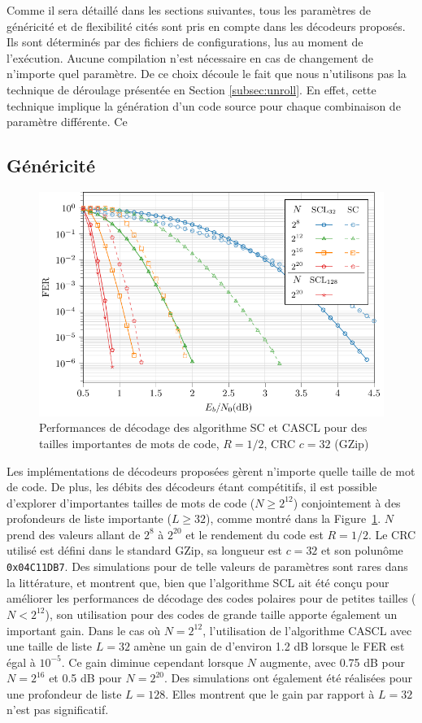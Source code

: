 Comme il sera détaillé dans les sections suivantes, tous les paramètres de généricité et de flexibilité cités sont pris en compte dans les décodeurs proposés. Ils sont déterminés par des fichiers de configurations, lus au moment de l'exécution. Aucune compilation n'est nécessaire en cas de changement de n'importe quel paramètre. De ce choix découle le fait que nous n'utilisons pas la technique de déroulage présentée en Section \ref{subsec:unroll}. En effet, cette technique implique la génération d'un code source pour chaque combinaison de paramètre différente. Ce

\subsection{Généricité}

\begin{figure}[t]
\includegraphics[width=\textwidth]{main/ch2_fig/curves/code/tikz/code}
\caption{Performances de décodage des algorithme SC et CASCL pour des tailles importantes de mots de code, $R=1/2$, CRC $c=32$ (GZip)}
\label{fig:large_scl}
\end{figure}

Les implémentations de décodeurs proposées gèrent n'importe quelle taille de mot de code. De plus, les débits des décodeurs étant compétitifs, il est possible d'explorer d'importantes tailles de mots de code ($N\geq2^{12}$) conjointement à des profondeurs de liste importante ($L \geq 32$), comme montré dans la Figure~\ref{fig:large_scl}. $N$ prend des valeurs allant de $2^8$ à $2^{20}$ et le rendement du code est $R=1/2$. Le CRC utilisé est défini dans le standard GZip, sa longueur est $c=32$ et son polunôme \texttt{0x04C11DB7}. Des simulations pour de telle valeurs de paramètres sont rares dans la littérature, et montrent que, bien que l'algorithme SCL ait été conçu pour améliorer les performances de décodage des codes polaires pour de petites tailles ($N<2^{12}$), son utilisation pour des codes de grande taille apporte également un important gain. Dans le cas où $N=2^{12}$, l'utilisation de l'algorithme CASCL avec une taille de liste $L=32$ amène un gain de d'environ 1.2 dB lorsque le FER est égal à $10^{-5}$. Ce gain diminue cependant lorsque $N$ augmente, avec 0.75 dB pour $N=2^{16}$ et 0.5 dB pour $N=2^{20}$. Des simulations ont également été réalisées pour une profondeur de liste $L=128$. Elles montrent que le gain par rapport à $L=32$ n'est pas significatif.

